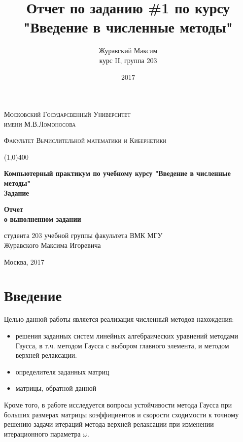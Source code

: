 \documentclass[12pt, a4paper]{report}
\title{Отчет по заданию \#1 по курсу "Введение в численные методы"}
\author{Журавский Максим \\
        курс II, группа 203}
\date{2017}
\begin{document}
\begin{titlepage}
    \begin{center}
    {\scshape\large Московский Государсвенный Университет \\
                    имени М.В.Ломоносова \par}
    {\scshape\large Факультет Вычислительной математики и Кибернетики \par}
    
    \begin{center}
    \line(1,0){400}
    \end{center}
    
    \vspace{6cm}
	{\Large\bfseries{} Компьютерный практикум по учебному курсу
                     "Введение в численные методы" \\
                     Задание  \par}
    \vspace{3cm}
    {\Large\bfseries Отчет \\
            о выполненном задании \par}
    {\large студента 203 учебной группы факультета ВМК МГУ \\
            Журавского Максима Игоревича \par}
    \vfill
    {\normalsize Москва, 2017 \par}
    \end{center}
\end{titlepage}



\tableofcontents
\newpage



\chapter{Введение}
Целью данной работы является реализация численный методов нахождения:

\begin{itemize}
\item{решения заданных систем линейных алгебраических уравнений методами Гаусса,
        в т.ч. методом Гаусса с выбором главного элемента, и методом верхней релаксации.}
\item{определителя заданных матриц}
\item{матрицы, обратной данной}
\end{itemize}
\normalsize{Кроме того, в работе исследуется вопросы устойчивости метода Гаусса
            при больших размерах матрицы коэффициентов и скорости сходимости
            к точному решению задачи итераций метода верхней релаксации при изменении
            итерационного параметра $\omega$}.
\newpage
\end{document}

